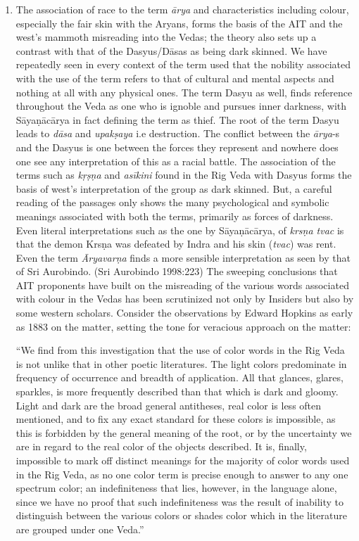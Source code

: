 \begin{enumerate}
 \item The association of race to the term \textit{ārya} and characteristics including colour, especially the fair skin with the Aryans, forms the basis of the AIT and the west’s mammoth misreading into the Vedas; the theory also sets up a contrast with that of the Dasyus/Dāsas as being dark skinned. We have repeatedly seen in every context of the term used that the nobility associated with the use of the term refers to that of cultural and mental aspects and nothing at all with any physical ones. The term Dasyu as well, finds reference throughout the Veda as one who is ignoble and pursues inner darkness, with Sāyaṇācārya in fact defining the term as thief. The root of the term Dasyu leads to \textit{dāsa} and \textit{upakṣaya} i.e destruction. The conflict between the \textit{ārya}-s and the Dasyus is one between the forces they represent and nowhere does one see any interpretation of this as a racial battle. The association of the terms such as \textit{kṛṣṇa }and \textit{asīkini} found in the Rig Veda with Dasyus forms the basis of west’s interpretation of the group as dark skinned. But, a careful reading of the passages only shows the many psychological and symbolic meanings associated with both the terms, primarily as forces of darkness. Even literal interpretations such as the one by Sāyaṇācārya, of \textit{krsṇa tvac} is that the demon Krsṇa was defeated by Indra and his skin (\textit{tvac}) was rent. Even the term \textit{Āryavarṇa} finds a more sensible interpretation as seen by that of Sri Aurobindo. (Sri Aurobindo 1998:223) The sweeping conclusions that AIT proponents have built on the misreading of the various words associated with colour in the Vedas has been scrutinized not only by Insiders but also by some western scholars. Consider the observations by Edward Hopkins as early as 1883 on the matter, setting the tone for veracious approach on the matter:

\begin{myquote}
“We find from this investigation that the use of color words in the Rig Veda is not unlike that in other poetic literatures. The light colors predominate in frequency of occurrence and breadth of application. All that glances, glares, sparkles, is more frequently described than that which is dark and gloomy. Light and dark are the broad general antitheses, real color is less often mentioned, and to fix any exact standard for these colors is impossible, as this is forbidden by the general meaning of the root, or by the uncertainty we are in regard to the real color of the objects described. It is, finally, impossible to mark off distinct meanings for the majority of color words used in the Rig Veda, as no one color term is precise enough to answer to any one spectrum color; an indefiniteness that lies, however, in the language alone, since we have no proof that such indefiniteness was the result of inability to distinguish between the various colors or shades color which in the literature are grouped under one Veda.”


\end{myquote}
\end{enumerate}
